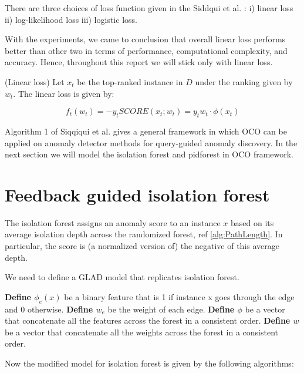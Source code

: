 There are three choices of loss function given in the Siddqui et al. \cite{10.1145/3219819.3220083}: i) linear loss ii) log-likelihood loss iii) logistic loss. 

With the experiments, we came to conclusion that overall linear loss performs better than other two in terms of performance, computational complexity, and accuracy.
Hence, throughout this report we will stick only with linear loss.

\begin{defn}
    \label{defn:linear-loss}
    (Linear loss)
    Let $x_t$ be the top-ranked instance in $D$ under the ranking given by $w_t$.
    The linear loss is given by:

    \vspace{-2em}
    \begin{equation}
        \label{eq:linear-loss}
        f_t(w_t) = -y_t SCORE(x_t;w_t) = y_t w_t \cdot \phi (x_t)
    \end{equation}
\end{defn}

Algorithm 1 of Siqqiqui et al. \cite{10.1145/3219819.3220083} gives a general framework in which OCO can be applied on anomaly detector methods for query-guided anomaly discovery.
In the next section we will model the isolation forest and pidforest in OCO framework.


\section{Feedback guided isolation forest}
\label{sec:feedback-guided-iforest}

The isolation forest assigns an anomaly score to an instance $x$ based on its average isolation depth across the randomized forest, ref \ref{alg:PathLength}.
In particular, the score is (a normalized version of) the negative of
this average depth.

We need to define a GLAD model that replicates isolation forest.

\textbf{Define $\phi_e(x)$} be a binary feature that is 1 if instance x goes through the edge and 0 otherwise.
\textbf{Define $w_e$} be the weight of each edge.
\textbf{Define $\phi$}  be a vector that concatenate all the features across the forest in a consistent order.
\textbf{Define $w$}  be a vector that concatenate all the weights across the forest in a consistent order.

Now the modified model for isolation forest is given by the following algorithms:

